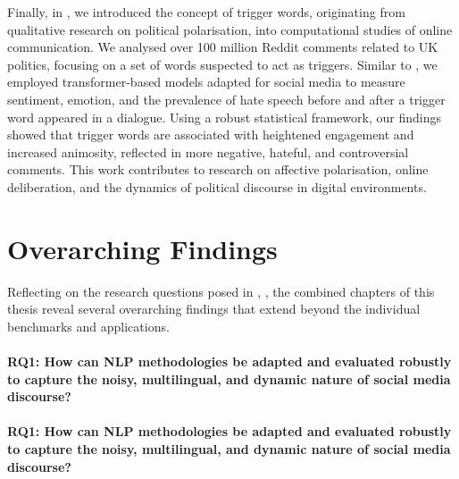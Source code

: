 Finally, in , we introduced the concept of trigger words, originating from qualitative research on political polarisation, into computational studies of online communication. We analysed over 100 million Reddit comments related to UK politics, focusing on a set of words suspected to act as triggers. Similar to , we employed transformer-based models adapted for social media to measure sentiment, emotion, and the prevalence of hate speech before and after a trigger word appeared in a dialogue. Using a robust statistical framework, our findings showed that trigger words are associated with heightened engagement and increased animosity, reflected in more negative, hateful, and controversial comments. This work contributes to research on affective polarisation, online deliberation, and the dynamics of political discourse in digital environments.





\section{Overarching Findings}
Reflecting on the research questions posed in ,  , the combined chapters of this thesis reveal several overarching findings that extend beyond the individual benchmarks and applications.

\paragraph{RQ1: How can \ac{NLP} methodologies be adapted and evaluated robustly to capture the noisy, multilingual, and dynamic nature of social media discourse?}

\paragraph{RQ1: How can \ac{NLP} methodologies be adapted and evaluated robustly to capture the noisy, multilingual, and dynamic nature of social media discourse?}

